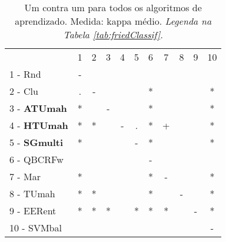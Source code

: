 \begin{table}[h]
\caption{Um contra um para todos os algoritmos de aprendizado. Medida: kappa médio. \textit{Legenda na Tabela \ref{tab:friedClassif}.}}
\begin{center}\begin{tabular}{lcc|cc|cc|cc|cc}
 			& 1 & 2 & 3 & 4 & 5 & 6 & 7 & 8 & 9 & 10\\
1 - Rnd  	& - &   &   &   &   &   &   &   &   &   \\
2 - Clu  	& . & - &   &   &   & * &   &   &   & * \\ \hline
3 - \textbf{ATUmah}	& * &   & - &   &   & * &   &   &   & * \\
4 - \textbf{HTUmah}	& * & * &   & - & . & * & + &   &   & * \\ \hline
5 - \textbf{SGmulti}	& * &   &   &   & - & * &   &   &   & * \\
6 - QBCRFw	&   &   &   &   &   & - &   &   &   &   \\ \hline
7 - Mar  	& * &   &   &   &   & * & - &   &   & * \\
8 - TUmah	& * & * &   &   &   & * &   & - &   & * \\ \hline
9 - EERent	& * & * & * &   & * & * & * &   & - & * \\
10 - SVMbal	&   &   &   &   &   &   &   &   &   & - \\ \hline\end{tabular}

\label{stratsALCKappaFriedAllhalf}
\end{center}
\end{table}